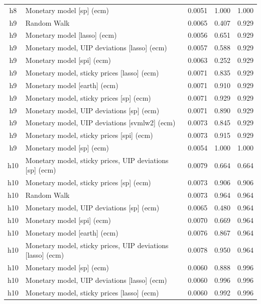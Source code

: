 \begin{ThreePartTable}
\begin{longtable}[t]{cp{5.5cm}ccc}
h8 & \raggedright Monetary model [sp] (ecm) & 0.0051 & 1.000 & 1.000\\
\addlinespace
h9 & \raggedright Random Walk & 0.0065 & 0.407 & 0.929\\
h9 & \raggedright Monetary model [lasso] (ecm) & 0.0056 & 0.651 & 0.929\\
h9 & \raggedright Monetary model, UIP deviations [lasso] (ecm) & 0.0057 & 0.588 & 0.929\\
h9 & \raggedright Monetary model [spi] (ecm) & 0.0063 & 0.252 & 0.929\\
h9 & \raggedright Monetary model, sticky prices [lasso] (ecm) & 0.0071 & 0.835 & 0.929\\
h9 & \raggedright Monetary model [earth] (ecm) & 0.0071 & 0.910 & 0.929\\
h9 & \raggedright Monetary model, sticky prices [sp] (ecm) & 0.0071 & 0.929 & 0.929\\
h9 & \raggedright Monetary model, UIP deviations [sp] (ecm) & 0.0071 & 0.890 & 0.929\\
h9 & \raggedright Monetary model, UIP deviations [svmlw2] (ecm) & 0.0073 & 0.845 & 0.929\\
h9 & \raggedright Monetary model, sticky prices [spi] (ecm) & 0.0073 & 0.915 & 0.929\\
h9 & \raggedright Monetary model [sp] (ecm) & 0.0054 & 1.000 & 1.000\\
\addlinespace
h10 & \raggedright Monetary model, sticky prices, UIP deviations [sp] (ecm) & 0.0079 & 0.664 & 0.664\\
h10 & \raggedright Monetary model, sticky prices [sp] (ecm) & 0.0073 & 0.906 & 0.906\\
h10 & \raggedright Random Walk & 0.0073 & 0.964 & 0.964\\
h10 & \raggedright Monetary model, UIP deviations [sp] (ecm) & 0.0065 & 0.480 & 0.964\\
h10 & \raggedright Monetary model [spi] (ecm) & 0.0070 & 0.669 & 0.964\\
h10 & \raggedright Monetary model [earth] (ecm) & 0.0076 & 0.867 & 0.964\\
h10 & \raggedright Monetary model, sticky prices, UIP deviations [lasso] (ecm) & 0.0078 & 0.950 & 0.964\\
h10 & \raggedright Monetary model [sp] (ecm) & 0.0060 & 0.888 & 0.996\\
h10 & \raggedright Monetary model, UIP deviations [lasso] (ecm) & 0.0060 & 0.996 & 0.996\\
h10 & \raggedright Monetary model, sticky prices [lasso] (ecm) & 0.0060 & 0.992 & 0.996\\

\end{longtable}
\end{ThreePartTable}
